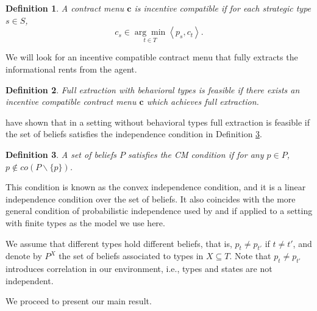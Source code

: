 \documentclass[12pt]{article}
\newtheorem{definition}{Definition}}
\begin{document}
	\begin{definition}\label{def:ic}
		A contract menu $\mathbf{c}$ is incentive compatible if for each strategic type $s\in S$,
			\[
				c_s\in\underset{t\in T}{\arg\min} \left<p_s,c_t\right>.
			\]

	\end{definition}

We will look for an incentive compatible contract menu that fully extracts the informational rents from the agent. 

	\begin{definition}
		Full extraction with behavioral types is feasible if there exists an incentive compatible contract menu $\mathbf{c}$ which achieves full extraction.
	\end{definition}
\citet{cremermclean1988} have shown that in a setting without behavioral types full extraction is feasible if the set of beliefs satisfies the independence condition in Definition \ref{def:cm}.

\begin{definition}\label{def:cm}
	A set of beliefs $P$ satisfies the CM condition if for any $p\in P$, $p\not\in co(P\backslash\{p\})$.
\end{definition}

This condition is known as the convex independence condition, and it is a linear independence condition over the set of beliefs. It also coincides with the more general condition of probabilistic independence used by \citet{mcafeereny1992} and \citet{lopomorigottishannon_detectability} if applied to a setting with finite types as the model we use here.

We assume that different types hold different beliefs, that is, $p_t\neq p_{t'}$ if $t \neq t'$, and denote by $P^X$ the set of beliefs associated to types in $X\subseteq T$. Note that $p_t\neq p_{t'}$ introduces correlation in our environment, i.e., types and states are not independent.


We proceed to present our main result.
\end{document}
